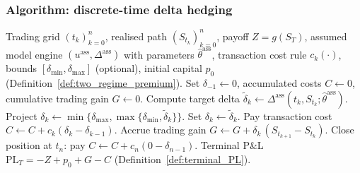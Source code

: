 \documentclass[12pt,a4paper]{article}
\theoremstyle{definition}
\theoremstyle{plain}
\theoremstyle{remark}
\theoremstyle{plain}
\begin{document}
\subsubsection{Algorithm: discrete-time delta hedging}
\label{subsubsec:delta_pseudocode}

\begin{algorithm}[H]
\caption{Discrete-time delta hedging under an assumed model}
\label{alg:delta_hedging}
\begin{algorithmic}[1]
\Require Trading grid $(t_k)_{k=0}^n$, realised path $(S_{t_k})_{k=0}^n$, payoff $Z=g(S_T)$,
assumed model engine $(u^{\mathrm{ass}},\Delta^{\mathrm{ass}})$ with parameters $\hat\theta^{\mathrm{ass}}$,
transaction cost rule $c_k(\cdot)$, bounds $[\delta_{\min},\delta_{\max}]$ (optional),
initial capital $p_0$ (Definition~\ref{def:two_regime_premium}).
\State Set $\delta_{-1}\gets 0$, accumulated costs $C\gets 0$, cumulative trading gain $G\gets 0$.
    \State Compute target delta $\tilde\delta_k \gets \Delta^{\mathrm{ass}}(t_k,S_{t_k};\hat\theta^{\mathrm{ass}})$.
        \State Project $\delta_k \gets \min\{\delta_{\max},\max\{\delta_{\min},\tilde\delta_k\}\}$.
    \Else
        \State Set $\delta_k \gets \tilde\delta_k$.
    \EndIf
    \State Pay transaction cost $C \gets C + c_k(\delta_k-\delta_{k-1})$.
    \State Accrue trading gain $G \gets G + \delta_k\,(S_{t_{k+1}}-S_{t_k})$.
\EndFor
\State Close position at $t_n$: pay $C \gets C + c_n(0-\delta_{n-1})$.
\State \Return Terminal P\&L $\mathrm{PL}_T = -Z + p_0 + G - C$ (Definition~\ref{def:terminal_PL}).
\end{algorithmic}
\end{algorithm}

\label{subsubsec:delta_robustness_map}
\end{document}
